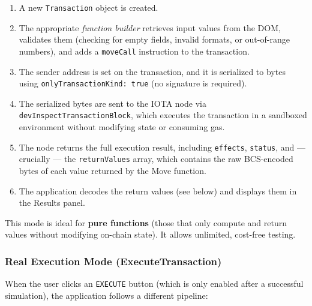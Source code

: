 \documentclass[12pt,a4paper]{article}
\begin{document}
\begin{enumerate}
    \item A new \texttt{Transaction} object is created.
    \item The appropriate \emph{function builder} retrieves input values from the DOM, validates them (checking for empty fields, invalid formats, or out-of-range numbers), and adds a \texttt{moveCall} instruction to the transaction.
    \item The sender address is set on the transaction, and it is serialized to bytes using \texttt{onlyTransactionKind: true} (no signature is required).
    \item The serialized bytes are sent to the IOTA node via \texttt{devInspectTransactionBlock}, which executes the transaction in a sandboxed environment without modifying state or consuming gas.
    \item The node returns the full execution result, including \texttt{effects}, \texttt{status}, and --- crucially --- the \texttt{returnValues} array, which contains the raw BCS-encoded bytes of each value returned by the Move function.
    \item The application decodes the return values (see below) and displays them in the Results panel.
\end{enumerate}

This mode is ideal for \textbf{pure functions} (those that only compute and return values without modifying on-chain state). It allows unlimited, cost-free testing.

\subsubsection{Real Execution Mode (ExecuteTransaction)}

When the user clicks an \texttt{EXECUTE} button (which is only enabled after a successful simulation), the application follows a different pipeline:
\end{document}
